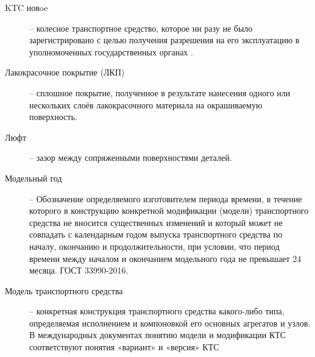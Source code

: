 \begin{description}
	\item
	[KTC новoe]  -- колесное транспортное средство, которое ни разу не было зарегистрировано с целью получения разрешения на его эксплуатацию в уполномоченных государственных органах \cite[часть III, п. 1.2]{minust:2018}.
	\item
	[Лакокрасочное покрытие (ЛКП)] -- сплошное покрытие, полученное в результате нанесения 	одного или нескольких слоёв лакокрасочного материала на окрашиваемую поверхность.
\item
[Люфт] -- зазор между сопряженными поверхностями деталей.	
\item[Модельный год] -- Обозначение определяемого изготовителем периода времени, в течение которого в конструкцию конкретной модификации (модели) транспортного средства не вносится существенных изменений и который может не совпадать с календарным годом выпуска транспортного средства по началу, окончанию и продолжительности, при условии, что период времени между началом и окончанием модельного года не превышает 24 месяца. ГОСТ 33990-2016.
\item
[Модель транспортного средства] -- конкретная конструкция транспортного средства какого-либо типа, определяемая исполнением и компоновкой его
основных агрегатов и узлов. В международных документах понятию модели и
модификации КТС соответствуют понятия «вариант» и «версия» КТС



\end{description}
